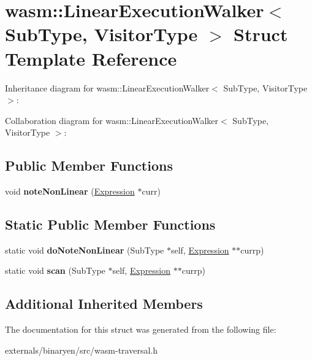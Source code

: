 \hypertarget{structwasm_1_1_linear_execution_walker}{}\section{wasm\+:\+:Linear\+Execution\+Walker$<$ Sub\+Type, Visitor\+Type $>$ Struct Template Reference}
\label{structwasm_1_1_linear_execution_walker}


Inheritance diagram for wasm\+:\+:Linear\+Execution\+Walker$<$ Sub\+Type, Visitor\+Type $>$\+:


Collaboration diagram for wasm\+:\+:Linear\+Execution\+Walker$<$ Sub\+Type, Visitor\+Type $>$\+:
\subsection*{Public Member Functions}
\begin{DoxyCompactItemize}
\item 
\mbox{\label{structwasm_1_1_linear_execution_walker_a6369c086c1cb33696a260f579bc53fe8}} 
void {\bfseries note\+Non\+Linear} (\mbox{\hyperlink{classwasm_1_1_expression}{Expression}} $\ast$curr)
\end{DoxyCompactItemize}
\subsection*{Static Public Member Functions}
\begin{DoxyCompactItemize}
\item 
\mbox{\label{structwasm_1_1_linear_execution_walker_a0f8454034458a0f99c82f76b2da3af7b}} 
static void {\bfseries do\+Note\+Non\+Linear} (Sub\+Type $\ast$self, \mbox{\hyperlink{classwasm_1_1_expression}{Expression}} $\ast$$\ast$currp)
\item 
\mbox{\label{structwasm_1_1_linear_execution_walker_a355f0a85c2e434bca8cfcfa3d32f5d4b}} 
static void {\bfseries scan} (Sub\+Type $\ast$self, \mbox{\hyperlink{classwasm_1_1_expression}{Expression}} $\ast$$\ast$currp)
\end{DoxyCompactItemize}
\subsection*{Additional Inherited Members}


The documentation for this struct was generated from the following file\+:\begin{DoxyCompactItemize}
\item 
externals/binaryen/src/wasm-\/traversal.\+h\end{DoxyCompactItemize}
